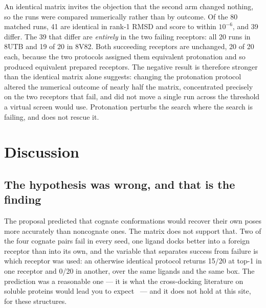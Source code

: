 \documentclass[sigconf]{acmart}
\begin{document}
An identical matrix invites the objection that the second arm changed nothing, so
the runs were compared numerically rather than by outcome. Of the 80 matched runs,
41 are identical in rank-1 RMSD and score to within $10^{-6}$, and 39 differ. The
39 that differ are \emph{entirely} in the two failing receptors: all 20 runs in
8UTB and 19 of 20 in 8V82. Both succeeding receptors are unchanged, 20 of 20 each,
because the two protocols assigned them equivalent protonation and so produced
equivalent prepared receptors. The negative result is therefore stronger than the
identical matrix alone suggests: changing the protonation protocol altered the
numerical outcome of nearly half the matrix, concentrated precisely on the two
receptors that fail, and did not move a single run across the threshold a virtual
screen would use. Protonation perturbs the search where the search is failing, and
does not rescue it.

\section{Discussion}

\subsection*{The hypothesis was wrong, and that is the finding}
\label{sec:hypothesis}

The proposal predicted that cognate conformations would recover their own poses
more accurately than noncognate ones. The matrix does not support that. Two of the
four cognate pairs fail in every seed, one ligand docks better into a foreign
receptor than into its own, and the variable that separates success from failure
is which receptor was used: an otherwise identical protocol returns 15/20 at top-1
in one receptor and 0/20 in another, over the same ligands and the same box. The
prediction was a reasonable one --- it is what the cross-docking literature on
soluble proteins would lead you to expect~\cite{sutherland2007} --- and it
does not hold at this site, for these structures.
\end{document}
